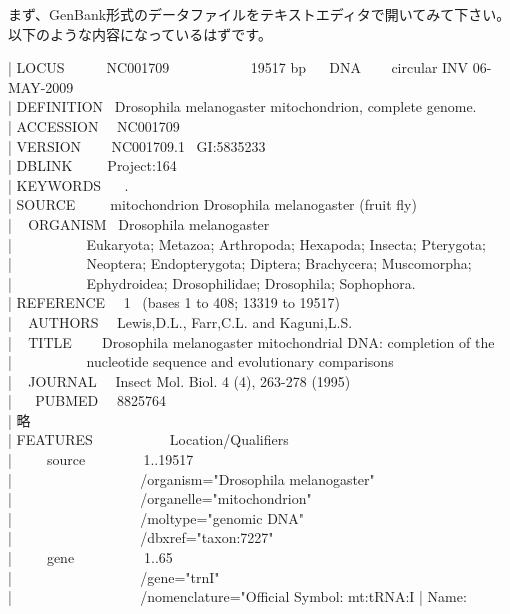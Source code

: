 \documentclass[titlepage,10pt,a4paper]{jsbook}
\newenvironment{content}{\begin{shaded}\vspace{-1em}\raggedright\ttfamily\footnotesize\setlength{\baselineskip}{1.4em}}{\end{shaded}\vspace{-1em}}
\begin{document}
まず、GenBank形式のデータファイルをテキストエディタで開いてみて下さい。以下のような内容になっているはずです。
\begin{content}
| LOCUS~ ~ ~ ~NC{\textunderscore}001709~ ~ ~ ~ ~ ~ ~ 19517 bp~ ~ DNA~ ~ ~circular INV 06-MAY-2009\\
| DEFINITION~ Drosophila melanogaster mitochondrion, complete genome.\\
| ACCESSION~ ~NC{\textunderscore}001709\\
| VERSION~ ~ ~NC{\textunderscore}001709.1~ GI:5835233\\
| DBLINK~ ~ ~ Project:164\\
| KEYWORDS~ ~ .\\
| SOURCE~ ~ ~ mitochondrion Drosophila melanogaster (fruit fly)\\
| ~ ORGANISM~ Drosophila melanogaster\\
| ~ ~ ~ ~ ~ ~ Eukaryota; Metazoa; Arthropoda; Hexapoda; Insecta; Pterygota;\\
| ~ ~ ~ ~ ~ ~ Neoptera; Endopterygota; Diptera; Brachycera; Muscomorpha;\\
| ~ ~ ~ ~ ~ ~ Ephydroidea; Drosophilidae; Drosophila; Sophophora.\\
| REFERENCE~ ~1~ (bases 1 to 408; 13319 to 19517)\\
| ~ AUTHORS~ ~Lewis,D.L., Farr,C.L. and Kaguni,L.S.\\
| ~ TITLE~ ~ ~Drosophila melanogaster mitochondrial DNA: completion of the\\
| ~ ~ ~ ~ ~ ~ nucleotide sequence and evolutionary comparisons\\
| ~ JOURNAL~ ~Insect Mol. Biol. 4 (4), 263-278 (1995)\\
| ~ ~PUBMED~ ~8825764\\
| 略\\
| FEATURES~ ~ ~ ~ ~ ~ ~Location/Qualifiers\\
| ~ ~ ~source~ ~ ~ ~ ~ 1..19517\\
| ~ ~ ~ ~ ~ ~ ~ ~ ~ ~ ~/organism="Drosophila melanogaster"\\
| ~ ~ ~ ~ ~ ~ ~ ~ ~ ~ ~/organelle="mitochondrion"\\
| ~ ~ ~ ~ ~ ~ ~ ~ ~ ~ ~/mol{\textunderscore}type="genomic DNA"\\
| ~ ~ ~ ~ ~ ~ ~ ~ ~ ~ ~/db{\textunderscore}xref="taxon:7227"\\
| ~ ~ ~gene~ ~ ~ ~ ~ ~ 1..65\\
| ~ ~ ~ ~ ~ ~ ~ ~ ~ ~ ~/gene="trnI"\\
| ~ ~ ~ ~ ~ ~ ~ ~ ~ ~ ~/nomenclature="Official Symbol: mt:tRNA:I | Name:\\

\end{content}
\end{document}
